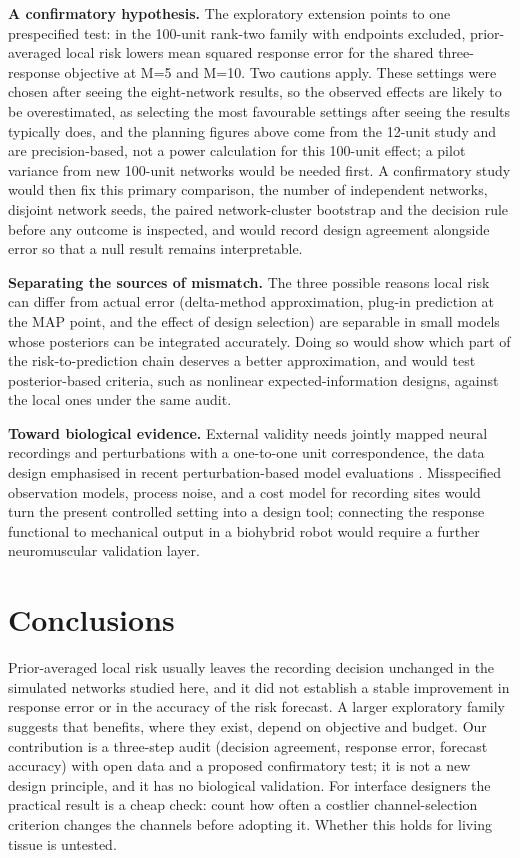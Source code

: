 \textbf{A confirmatory hypothesis.} The exploratory extension points to one prespecified test: in the 100-unit rank-two family with endpoints excluded, prior-averaged local risk lowers mean squared response error for the shared three-response objective at M=5 and M=10. Two cautions apply. These settings were chosen after seeing the eight-network results, so the observed effects are likely to be overestimated, as selecting the most favourable settings after seeing the results typically does, and the planning figures above come from the 12-unit study and are precision-based, not a power calculation for this 100-unit effect; a pilot variance from new 100-unit networks would be needed first. A confirmatory study would then fix this primary comparison, the number of independent networks, disjoint network seeds, the paired network-cluster bootstrap and the decision rule before any outcome is inspected, and would record design agreement alongside error so that a null result remains interpretable.

\textbf{Separating the sources of mismatch.} The three possible reasons local risk can differ from actual error (delta-method approximation, plug-in prediction at the MAP point, and the effect of design selection) are separable in small models whose posteriors can be integrated accurately. Doing so would show which part of the risk-to-prediction chain deserves a better approximation, and would test posterior-based criteria, such as nonlinear expected-information designs, against the local ones under the same audit.

\textbf{Toward biological evidence.} External validity needs jointly mapped neural recordings and perturbations with a one-to-one unit correspondence, the data design emphasised in recent perturbation-based model evaluations \cite{ref08}. Misspecified observation models, process noise, and a cost model for recording sites would turn the present controlled setting into a design tool; connecting the response functional to mechanical output in a biohybrid robot \cite{ref01,ref02} would require a further neuromuscular validation layer.

\section{Conclusions}

Prior-averaged local risk usually leaves the recording decision unchanged in the simulated networks studied here, and it did not establish a stable improvement in response error or in the accuracy of the risk forecast. A larger exploratory family suggests that benefits, where they exist, depend on objective and budget. Our contribution is a three-step audit (decision agreement, response error, forecast accuracy) with open data and a proposed confirmatory test; it is not a new design principle, and it has no biological validation. For interface designers the practical result is a cheap check: count how often a costlier channel-selection criterion changes the channels before adopting it. Whether this holds for living tissue is untested.

